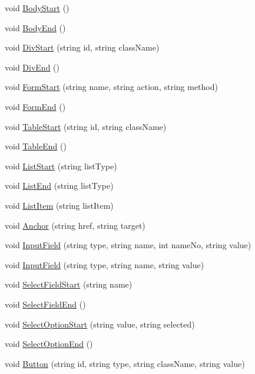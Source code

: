 \begin{DoxyCompactItemize}
\item 
void \hyperlink{classPageStructureMaker_ab7a645675166f34fac99f1ed8feb7c27}{Body\-Start} ()
\item 
void \hyperlink{classPageStructureMaker_ac91e234e2d54dedd9d7e556fabf21d2b}{Body\-End} ()
\item 
void \hyperlink{classPageStructureMaker_a927f92889555dd316c129f706be86a5c}{Div\-Start} (string id, string class\-Name)
\item 
void \hyperlink{classPageStructureMaker_a2913e76bf188ed777dcd33003ef6207d}{Div\-End} ()
\item 
void \hyperlink{classPageStructureMaker_a3f25d5b844a2251883acb80d8fabb77d}{Form\-Start} (string name, string action, string method)
\item 
void \hyperlink{classPageStructureMaker_a65d97f23bb543f3db5201b2009f7f65a}{Form\-End} ()
\item 
void \hyperlink{classPageStructureMaker_a04e68e69005f3933e0f496c3db474daf}{Table\-Start} (string id, string class\-Name)
\item 
void \hyperlink{classPageStructureMaker_a7f8fefbe7a825c1b7761fc8a0f1bb8e4}{Table\-End} ()
\item 
void \hyperlink{classPageStructureMaker_ac24ce26202757aaa30402155daf8a3d0}{List\-Start} (string list\-Type)
\item 
void \hyperlink{classPageStructureMaker_a8578b1555ad2fc92a9efc7dbf7d1fe87}{List\-End} (string list\-Type)
\item 
void \hyperlink{classPageStructureMaker_adf4116e526026edc3c8a3bcf96a7e929}{List\-Item} (string list\-Item)
\item 
void \hyperlink{classPageStructureMaker_a8c0fae5b599182863066de56ae0cea42}{Anchor} (string href, string target)
\item 
void \hyperlink{classPageStructureMaker_a3547027801e298307527f1e934787b13}{Input\-Field} (string type, string name, int name\-No, string value)
\item 
void \hyperlink{classPageStructureMaker_a928ea6f84a8f7833c128034068a4b9a7}{Input\-Field} (string type, string name, string value)
\item 
void \hyperlink{classPageStructureMaker_ae8684bb66ca463e2f92e09c96137f9e3}{Select\-Field\-Start} (string name)
\item 
void \hyperlink{classPageStructureMaker_a81eb3cdbc840a4c8165cef87330ade09}{Select\-Field\-End} ()
\item 
void \hyperlink{classPageStructureMaker_a77856078e74dab25329132ea07466f92}{Select\-Option\-Start} (string value, string selected)
\item 
void \hyperlink{classPageStructureMaker_a7682f479f7f1012d426ec9f9535def60}{Select\-Option\-End} ()
\item 
void \hyperlink{classPageStructureMaker_a419feca1cfdb50e1be757eb1c2707a73}{Button} (string id, string type, string class\-Name, string value)
\end{DoxyCompactItemize}
